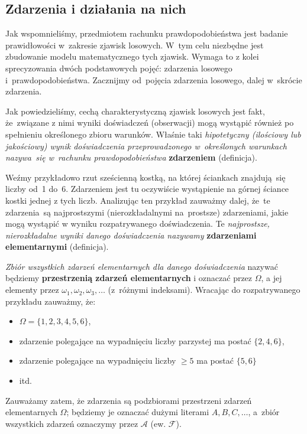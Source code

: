 \documentclass[10pt,a4paper]{article}
\begin{document}
\subsection{Zdarzenia i działania na nich}
Jak wspomnieliśmy, przedmiotem rachunku prawdopodobieństwa jest badanie
prawidłowości w~zakresie zjawisk losowych. W~tym celu niezbędne jest zbudowanie
modelu matematycznego tych zjawisk. Wymaga to z kolei sprecyzowania dwóch
podstawowych pojęć: zdarzenia losowego i~prawdopodobieństwa. Zacznijmy
od~pojęcia zdarzenia losowego, dalej w~skrócie zdarzenia.

Jak powiedzieliśmy, cechą charakterystyczną zjawisk losowych jest fakt,
że~związane z nimi wyniki doświadczeń (obserwacji) mogą wystąpić również
po spełnieniu określonego zbioru warunków. Właśnie taki \textit{hipotetyczny
 (ilościowy lub jakościowy) wynik doświadczenia przeprowadzonego w~określonych
warunkach nazywa~się w~rachunku prawdopodobieństwa} \textbf{zdarzeniem} (definicja).

Weźmy przykładowo rzut sześcienną kostką, na której ściankach znajdują~się
liczby od~1 do~6. Zdarzeniem jest tu oczywiście wystąpienie na górnej ściance
kostki jednej z tych liczb. Analizując ten przykład zauważmy dalej, że~te
zdarzenia~są najprostszymi (nierozkładalnymi na~prostsze) zdarzeniami, jakie
mogą wystąpić w wyniku rozpatrywanego doświadczenia. Te \textit{najprostsze,
nierozkładalne wyniki danego doświadczenia nazywamy} \textbf{zdarzeniami
elementarnymi} (definicja).

\textit{Zbiór wszystkich zdarzeń elementarnych dla danego doświadczenia} nazywać
będziemy \textbf{przestrzenią zdarzeń elementarnych} i oznaczać przez $\Omega$,
a jej elementy przez $\omega_1, \omega_2, \omega_3,\dotsc$ (z~różnymi indeksami).
Wracając do rozpatrywanego przykładu zauważmy, że:
\begin{itemize}
  \item $\Omega = \{1, 2, 3, 4, 5, 6\}$,
  \item zdarzenie polegające na wypadnięciu liczby parzystej ma postać
    $\{2,4,6\}$,
  \item zdarzenie polegające na wypadnięciu liczby $\geq5$ ma postać $\{5, 6\}$
  \item itd.
\end{itemize}

Zauważamy zatem, że zdarzenia są podzbiorami przestrzeni zdarzeń elementarnych
$\Omega$; będziemy je oznaczać dużymi literami $A, B, C,\dotsc$, a~zbiór
wszystkich zdarzeń oznaczymy przez $\mathscr{A}$ (ew. $\mathscr{F}$).
\end{document}
